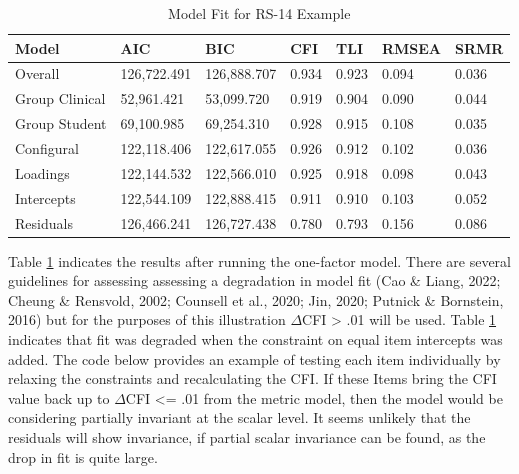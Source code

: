 \documentclass[
  man,floatsintext]{apa7}
\begin{document}
\begin{table}[tbp]

\begin{center}
\begin{threeparttable}

\caption{\label{tab:rs-table}Model Fit for RS-14 Example}

\begin{tabular}{lllllll}
\toprule
Model & AIC & BIC & CFI & TLI & RMSEA & SRMR\\
\midrule
Overall & 126,722.491 & 126,888.707 & 0.934 & 0.923 & 0.094 & 0.036\\
Group Clinical & 52,961.421 & 53,099.720 & 0.919 & 0.904 & 0.090 & 0.044\\
Group Student & 69,100.985 & 69,254.310 & 0.928 & 0.915 & 0.108 & 0.035\\
Configural & 122,118.406 & 122,617.055 & 0.926 & 0.912 & 0.102 & 0.036\\
Loadings & 122,144.532 & 122,566.010 & 0.925 & 0.918 & 0.098 & 0.043\\
Intercepts & 122,544.109 & 122,888.415 & 0.911 & 0.910 & 0.103 & 0.052\\
Residuals & 126,466.241 & 126,727.438 & 0.780 & 0.793 & 0.156 & 0.086\\
\bottomrule
\end{tabular}

\end{threeparttable}
\end{center}

\end{table}

Table \ref{tab:rs-table} indicates the results after running the one-factor model. There are several guidelines for assessing assessing a degradation in model fit (Cao \& Liang, 2022; Cheung \& Rensvold, 2002; Counsell et al., 2020; Jin, 2020; Putnick \& Bornstein, 2016) but for the purposes of this illustration \(\Delta\)CFI \textgreater{} .01 will be used. Table \ref{tab:rs-table} indicates that fit was degraded when the constraint on equal item intercepts was added. The code below provides an example of testing each item individually by relaxing the constraints and recalculating the CFI. If these Items bring the CFI value back up to \(\Delta\)CFI \textless= .01 from the metric model, then the model would be considering partially invariant at the scalar level. It seems unlikely that the residuals will show invariance, if partial scalar invariance can be found, as the drop in fit is quite large.
\end{document}
